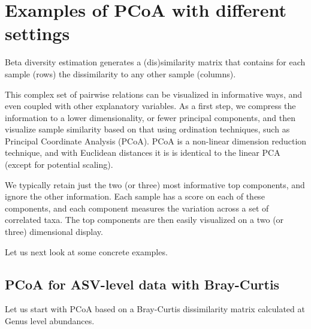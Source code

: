 \documentclass[
  oneside]{book}
\begin{document}
\hypertarget{examples-of-pcoa-with-different-settings}{%
\section{Examples of PCoA with different settings}\label{examples-of-pcoa-with-different-settings}}

Beta diversity estimation generates a (dis)similarity matrix that
contains for each sample (rows) the dissimilarity to any other sample
(columns).

This complex set of pairwise relations can be visualized in
informative ways, and even coupled with other explanatory
variables. As a first step, we compress the information to a lower
dimensionality, or fewer principal components, and then visualize
sample similarity based on that using ordination techniques, such as
Principal Coordinate Analysis (PCoA). PCoA is a non-linear dimension
reduction technique, and with Euclidean distances it is is identical
to the linear PCA (except for potential scaling).

We typically retain just the two (or three) most informative top
components, and ignore the other information. Each sample has a score
on each of these components, and each component measures the variation
across a set of correlated taxa. The top components are then easily
visualized on a two (or three) dimensional display.

Let us next look at some concrete examples.

\hypertarget{pcoa-for-asv-level-data-with-bray-curtis}{%
\subsection{PCoA for ASV-level data with Bray-Curtis}\label{pcoa-for-asv-level-data-with-bray-curtis}}

Let us start with PCoA based on a Bray-Curtis dissimilarity matrix
calculated at Genus level abundances.
\end{document}
